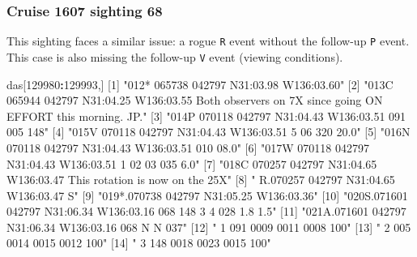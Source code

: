\documentclass[
]{book}
\newenvironment{Shaded}{\begin{snugshade}}{\end{snugshade}}
\newcommand{\DecValTok}[1]{\textcolor[rgb]{0.00,0.00,0.81}{#1}}
\newcommand{\NormalTok}[1]{#1}
\newcommand{\SpecialCharTok}[1]{\textcolor[rgb]{0.81,0.36,0.00}{\textbf{#1}}}
\newcommand{\StringTok}[1]{\textcolor[rgb]{0.31,0.60,0.02}{#1}}
\begin{document}
\hypertarget{cruise-1607-sighting-68}{%
\subsubsection*{Cruise 1607 sighting 68}\label{cruise-1607-sighting-68}}

This sighting faces a similar issue: a rogue \texttt{R} event without the follow-up \texttt{P} event. This case is also missing the follow-up \texttt{V} event (viewing conditions).

\begin{Shaded}
\begin{Highlighting}[]
\NormalTok{das[}\DecValTok{129980}\SpecialCharTok{:}\DecValTok{129993}\NormalTok{,] }
\NormalTok{ [}\DecValTok{1}\NormalTok{] }\StringTok{"012* 065738 042797 N31:03.98 W136:03.60"}                                                              
\NormalTok{ [}\DecValTok{2}\NormalTok{] }\StringTok{"013C 065944 042797 N31:04.25 W136:03.55 Both observers on 7X since going ON EFFORT this morning.  JP."}
\NormalTok{ [}\DecValTok{3}\NormalTok{] }\StringTok{"014P 070118 042797 N31:04.43 W136:03.51  091  005  148"}                                               
\NormalTok{ [}\DecValTok{4}\NormalTok{] }\StringTok{"015V 070118 042797 N31:04.43 W136:03.51    5   06  320      20.0"}                                     
\NormalTok{ [}\DecValTok{5}\NormalTok{] }\StringTok{"016N 070118 042797 N31:04.43 W136:03.51  010 08.0"}                                                    
\NormalTok{ [}\DecValTok{6}\NormalTok{] }\StringTok{"017W 070118 042797 N31:04.43 W136:03.51    1   02   03  035  6.0"}                                     
\NormalTok{ [}\DecValTok{7}\NormalTok{] }\StringTok{"018C 070257 042797 N31:04.65 W136:03.47 This rotation is now on the 25X"}                              
\NormalTok{ [}\DecValTok{8}\NormalTok{] }\StringTok{"   R.070257 042797 N31:04.65 W136:03.47    S"}                                                         
\NormalTok{ [}\DecValTok{9}\NormalTok{] }\StringTok{"019*.070738 042797 N31:05.25 W136:03.36"}                                                              
\NormalTok{[}\DecValTok{10}\NormalTok{] }\StringTok{"020S.071601 042797 N31:06.34 W136:03.16  068  148    3    4  028  1.8  1.5"}                           
\NormalTok{[}\DecValTok{11}\NormalTok{] }\StringTok{"021A.071601 042797 N31:06.34 W136:03.16  068         N    N  037"}                                     
\NormalTok{[}\DecValTok{12}\NormalTok{] }\StringTok{"   1                                     091 0009 0011 0008  100"}                                     
\NormalTok{[}\DecValTok{13}\NormalTok{] }\StringTok{"   2                                     005 0014 0015 0012  100"}                                     
\NormalTok{[}\DecValTok{14}\NormalTok{] }\StringTok{"   3                                     148 0018 0023 0015  100"}                                     
\end{Highlighting}
\end{Shaded}
\end{document}
